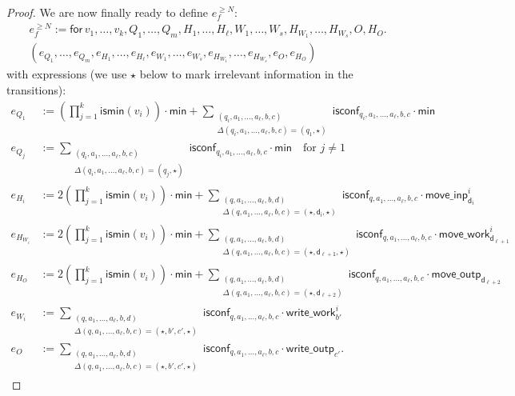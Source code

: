 \begin{proof}
We are now finally ready to define $e_f^{\geq N}$:
\begin{multline*}
e_f^{\geq N}:= \mathsf{for\,} v_1,\ldots,v_{k},Q_1,\ldots,Q_m,H_1,\ldots,H_\ell,W_1,\ldots,W_s, H_{W_1},\ldots,H_{W_s},O,H_O . \\
(e_{Q_1},\ldots,e_{Q_m},e_{H_1},\ldots,e_{H_\ell},e_{W_1},\ldots,e_{W_s},e_{H_{W_1}},\ldots,e_{H_{W_s}},e_{O}, e_{H_O})
\end{multline*}
with expressions (we use $\star$ below to mark irrelevant information in the transitions):
 \allowdisplaybreaks
\begin{align*}
	e_{Q_1}&:=\left(\prod_{j=1}^{k} \textsf{ismin}(v_i)\right)\cdot\mathsf{min}
	+ \sum_{\substack{(q_i,a_1,\ldots,a_\ell,b,c)\\
	\Delta(q_i,a_1,\ldots,a_\ell,b,c)=(q_1,\star)}} \!\!\!\!\!\!\!\!\! \mathsf{isconf}_{q_i,a_1,\ldots,a_\ell,b,c}\cdot \mathsf{min} \\
	e_{Q_j}&:=\sum_{\substack{(q_i,a_1,\ldots,a_\ell,b,c)\\
	\Delta(q_i,a_1,\ldots,a_\ell,b,c)=(q_j,\star)}} \!\!\!\!\!\!\!\!\! \mathsf{isconf}_{q_i,a_1,\ldots,a_\ell,b,c}\cdot \mathsf{min}
	 \quad \text{for $j\neq 1$}\\
	e_{H_i}&:=2\left(\prod_{j=1}^{k} \textsf{ismin}(v_i)\right)\cdot\mathsf{min}
	+\sum_{\substack{(q,a_1,\ldots,a_\ell,b,d)\\
	\Delta(q,a_1,\ldots,a_\ell,b,c)=(\star,\mathsf{d_i},\star)}}\!\!\!\!\!\!\!\!\! \mathsf{isconf}_{q,a_1,\ldots,a_\ell,b,c}\cdot\mathsf{move\_inp}^i_{\mathsf{d}_i}\\
	e_{H_{W_i}}&:=2\left(\prod_{j=1}^{k} \textsf{ismin}(v_i)\right)\cdot\mathsf{min}
	+\sum_{\substack{(q,a_1,\ldots,a_\ell,b,d)\\
	\Delta(q,a_1,\ldots,a_\ell,b,c)=(\star,\mathsf{d_{\ell+1}},\star)}}\!\!\!\!\!\!\!\!\! \mathsf{isconf}_{q,a_1,\ldots,a_\ell,b,c}\cdot\mathsf{move\_work}_{\mathsf{d}_{\ell+1}}^i\\
	e_{H_O}&:=2\left(\prod_{j=1}^{k} \textsf{ismin}(v_i)\right)\cdot\mathsf{min}
	+\sum_{\substack{(q,a_1,\ldots,a_\ell,b,d)\\
	\Delta(q,a_1,\ldots,a_\ell,b,c)=(\star,\mathsf{d}_{\ell+2})}}\!\!\!\!\!\!\!\!\! \mathsf{isconf}_{q,a_1,\ldots,a_\ell,b,c}\cdot\mathsf{move\_outp}_{\mathsf{d}_{\ell+2}}\\
	e_{W_i}&:=\sum_{\substack{(q,a_1,\ldots,a_\ell,b,d)\\
	\Delta(q,a_1,\ldots,a_\ell,b,c)=(\star,b',c',\star)}}\!\!\!\!\!\!\!\!\! \mathsf{isconf}_{q,a_1,\ldots,a_\ell,b,c}\cdot\mathsf{write\_work}_{b'}^i\\
	e_{O}&:=\sum_{\substack{(q,a_1,\ldots,a_\ell,b,d)\\
	\Delta(q,a_1,\ldots,a_\ell,b,c)=(\star,b',c',\star)}}\!\!\!\!\!\!\!\!\! \mathsf{isconf}_{q,a_1,\ldots,a_\ell,b,c}\cdot\mathsf{write\_outp}_{c'}.
\end{align*}


\end{proof}
